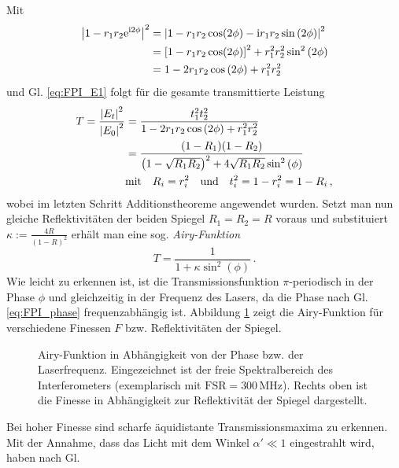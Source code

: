 Mit
\begin{equation}\label{eq:betrags-quadrat_imag}
	\begin{split}
		\left|1-r_1r_2\mathrm{e}^{\mathrm{i}2\phi}\right|^2&=\left|1-r_1r_2\cos(2\phi)-\mathrm{i}r_1r_2\sin{(2\phi})\right|^2\\
		&=\left[1-r_1r_2\cos(2\phi)\right]^2+r_1^2r_2^2\sin^2{(2\phi)}\\
		&=1-2r_1r_2\cos{(2\phi)}+r_1^2r_2^2
	\end{split}
\end{equation}
und Gl. \eqref{eq:FPI_E1} folgt für die gesamte transmittierte Leistung
\begin{equation}\label{eq:FPI_transmission}
	\begin{split}
		T=\frac{\left|E_t\right|^2}{\left|E_0\right|^2}
		&=\frac{t_1^2t_2^2}{1-2r_1r_2\cos{(2\phi)}+r_1^2r_2^2}\\
		&=\frac{(1-R_1)(1-R_2)}{\left(1-\sqrt{R_1R_2}\right)^2+4\sqrt{R_1R_2}\sin^2{(\phi)}}\\
		&\text{mit}\quad
		R_i=r_i^2
		\quad\text{und}\quad
		t_i^2=1-r_i^2=1-R_i\,,
	\end{split}
\end{equation}
wobei im letzten Schritt Additionstheoreme angewendet wurden.
Setzt man nun gleiche Reflektivitäten der beiden Spiegel $R_1=R_2=R$ voraus und
substituiert $\kappa:=\frac{4R}{(1-R)^2}$ erhält man eine sog.
\textit{Airy-Funktion}
\begin{equation}\label{eq:FPI_airy-funktion}
	T=\frac{1}{1+\kappa\sin^2{(\phi)}}\,.
\end{equation}
Wie leicht zu erkennen ist, ist die Transmissionsfunktion $\pi$-periodisch in
der Phase $\phi$ und gleichzeitig in der Frequenz des Lasers, da die Phase nach
Gl. \eqref{eq:FPI_phase} frequenzabhängig ist. Abbildung
\ref{fig:airy-funktion} zeigt die Airy-Funktion für verschiedene Finessen
$F$ bzw. Reflektivitäten der Spiegel.
\begin{figure}[h]
	\centering
	\footnotesize
	
	\caption[Airy-Funktion]{Airy-Funktion
	in Abhängigkeit von der Phase bzw.
	der Laserfrequenz. Eingezeichnet ist
	der freie Spektralbereich des
	Interferometers (exemplarisch mit $\text{FSR}=300\,$MHz). Rechts oben ist die
	Finesse in Abhängigkeit zur
	Reflektivität der Spiegel dargestellt.}
	\label{fig:airy-funktion}
\end{figure}
Bei hoher Finesse sind scharfe
äquidistante Transmissionsmaxima zu erkennen. Mit der Annahme, dass das Licht
mit dem Winkel $\alpha'\ll1$ eingestrahlt wird, haben nach Gl.
